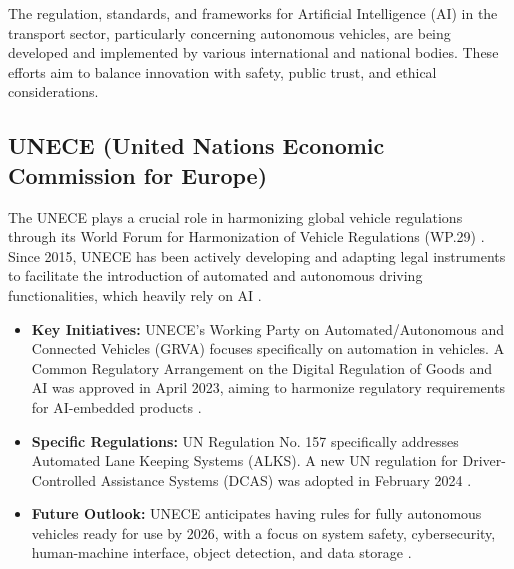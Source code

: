 The regulation, standards, and frameworks for Artificial Intelligence (AI) in the transport sector, particularly concerning autonomous vehicles, are being developed and implemented by various international and national bodies. These efforts aim to balance innovation with safety, public trust, and ethical considerations.

\subsection{UNECE (United Nations Economic Commission for Europe)}
The UNECE plays a crucial role in harmonizing global vehicle regulations through its World Forum for Harmonization of Vehicle Regulations (WP.29) \cite{UNECE_Reg}. Since 2015, UNECE has been actively developing and adapting legal instruments to facilitate the introduction of automated and autonomous driving functionalities, which heavily rely on AI \cite{UNECE_Reg}.
\begin{itemize}
    \item \textbf{Key Initiatives:} UNECE's Working Party on Automated/Autonomous and Connected Vehicles (GRVA) focuses specifically on automation in vehicles. A Common Regulatory Arrangement on the Digital Regulation of Goods and AI was approved in April 2023, aiming to harmonize regulatory requirements for AI-embedded products \cite{Rhomotion_UNECE, MisterGreen_UNECE}.
    \item \textbf{Specific Regulations:} UN Regulation No. 157 specifically addresses Automated Lane Keeping Systems (ALKS). A new UN regulation for Driver-Controlled Assistance Systems (DCAS) was adopted in February 2024 \cite{UNOGNewsroom_UNECE}.
    \item \textbf{Future Outlook:} UNECE anticipates having rules for fully autonomous vehicles ready for use by 2026, with a focus on system safety, cybersecurity, human-machine interface, object detection, and data storage \cite{Rhomotion_UNECE}.
\end{itemize}

